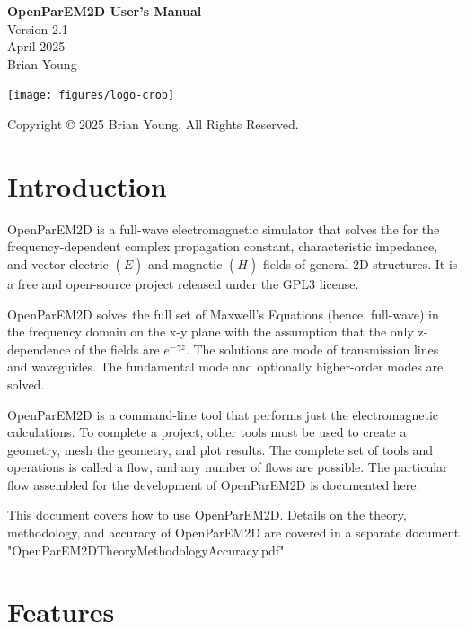 \documentclass[titlepage]{article}
\renewcommand\_{\textunderscore\linebreak[1]}
\begin{document}
\begin{titlepage}

   \centering
   \vspace*{3cm}
   {\huge\bfseries OpenParEM2D User's Manual} \\
   \vskip1cm
   {\Large Version 2.1} \\
   \vskip1cm
   {\Large April 2025} \\
   \vskip1cm
   {\Large Brian Young} \\

   \vfill

   \texttt{[image: figures/logo-crop]}

   \vspace*{\fill}
   Copyright \copyright{} 2025 Brian Young. All Rights Reserved.
\end{titlepage}

\tableofcontents

\newpage
\section{Introduction}

OpenParEM2D is a full-wave electromagnetic simulator that solves the for the frequency-dependent complex propagation constant, characteristic impedance, and vector electric $(\overline{E})$ and magnetic $(\overline{H})$ fields of general 2D structures.  It is a free and open-source project released under the GPL3 license.

OpenParEM2D solves the full set of Maxwell's Equations (hence, full-wave) in the frequency domain on the x-y plane with the assumption that the only z-dependence of the fields are $e^{-\gamma z}$.  The solutions are mode of transmission lines and waveguides.  The fundamental mode and optionally higher-order modes are solved.

OpenParEM2D is a command-line tool that performs just the electromagnetic calculations.  To complete a project, other tools must be used to create a geometry, mesh the geometry, and plot results.  The complete set of tools and operations is called a flow, and any number of flows are possible.  The particular flow assembled for the development of OpenParEM2D is documented here.

This document covers how to use OpenParEM2D.  Details on the theory, methodology, and accuracy of OpenParEM2D are covered in a separate document "OpenParEM2D\_Theory\_Methodology\_Accuracy.pdf".

\section{Features}
\end{document}
